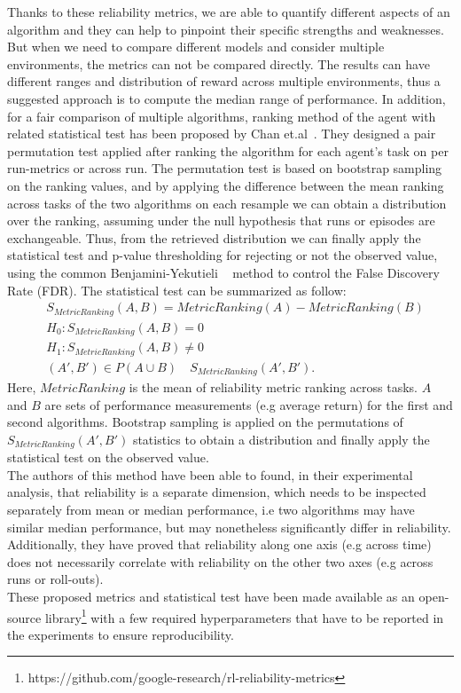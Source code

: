 \documentclass{article}
\begin{document}
Thanks to these reliability metrics, we are able to quantify different aspects of an algorithm and they can help to pinpoint their specific strengths and weaknesses. But when we need to compare different models and consider multiple environments, the metrics can not be compared directly.
The results can have different ranges and distribution of reward across multiple environments, thus a suggested approach is to compute the median range of performance. In addition, for a fair comparison of multiple algorithms, ranking method of the agent with related statistical test has been proposed by Chan et.al~\cite{GoogleMeasure}. They designed a pair permutation test applied after ranking the algorithm for each agent's task on per run-metrics or across run. The permutation test is based on bootstrap sampling on the ranking values, and by applying the difference between the mean ranking across tasks of the two algorithms on each resample we can obtain a distribution over the ranking, assuming under the null hypothesis that runs or episodes are exchangeable. Thus, from the retrieved distribution we can finally apply the statistical test and p-value thresholding for rejecting or not the observed value, using the common Benjamini-Yekutieli ~\cite{FDR} method to control the False Discovery Rate (FDR). The statistical test can be summarized as follow:
\begin{equation}
\begin{split}
	&S_{MetricRanking}(A, B) = MetricRanking (A) - MetricRanking (B) \\
	&H_0 : S_{MetricRanking}(A, B) =  0 \\
	&H_1 : S_{MetricRanking}(A, B) \neq  0 \\
	&(A', B')\in P (A \cup B) \quad S_{MetricRanking}(A', B').
\end{split}
\end{equation}
Here, $MetricRanking$ is the mean of reliability metric ranking across tasks. $A$ and $B$ are sets of performance measurements (e.g average return) for the first and second algorithms. Bootstrap sampling is applied on the permutations of $ S_{MetricRanking}(A', B')$ statistics to obtain a distribution and finally apply the statistical test on the observed value.\\
The authors of this method have been able to found, in their experimental analysis, that reliability is a separate dimension, which needs to be inspected separately from mean or median performance, i.e two algorithms may have similar median performance, but may nonetheless significantly differ in reliability. Additionally, they have proved that reliability along one axis (e.g across time) does not necessarily correlate with reliability on the other two axes (e.g across runs or roll-outs).\\
These proposed metrics and statistical test have been made available as an open-source library\footnote{https://github.com/google-research/rl-reliability-metrics} with a few required hyperparameters that have to be reported in the experiments to ensure reproducibility.
\label{gen_inst}
\end{document}

